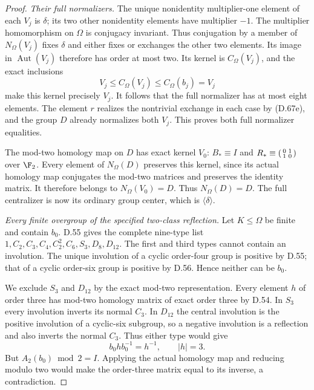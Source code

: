 \begin{proof}
\emph{Their full normalizers.}
The unique nonidentity multiplier-one element of each
$V_j$ is $\delta$; its two other nonidentity elements have
multiplier $-1$. The multiplier homomorphism on $\Omega$
is conjugacy invariant. Thus conjugation by a member of
$N_\Omega(V_j)$ fixes $\delta$ and either fixes or exchanges
the other two elements. Its image in $\operatorname{Aut}(V_j)$
therefore has order at most two. Its kernel is
$C_\Omega(V_j)$, and the exact inclusions
\[
 V_j\leq C_\Omega(V_j)\leq C_\Omega(b_j)=V_j
\]
make this kernel precisely $V_j$. It follows that the full
normalizer has at most eight elements. The element $r$
realizes the nontrivial exchange in each case by (D.67e),
and the group $D$ already normalizes both $V_j$.
This proves both full normalizer equalities.

The mod-two homology map on $D$ has exact kernel $V_0$:
$B_*\equiv I$ and $R_*\equiv\begin{psmallmatrix}0&1\\1&0\end{psmallmatrix}$
over $\F_2$. Every element of $N_\Omega(D)$ preserves this
kernel, since its actual homology map conjugates the
mod-two matrices and preserves the identity matrix.
It therefore belongs to $N_\Omega(V_0)=D$.
Thus $N_\Omega(D)=D$. The full centralizer is now its
ordinary group center, which is $\langle\delta\rangle$.

\emph{Every finite overgroup of the specified two-class reflection.}
Let $K\leq\Omega$ be finite and contain $b_0$.
D.55 gives the complete nine-type list
$1,C_2,C_3,C_4,C_2^2,C_6,S_3,D_8,D_{12}$.
The first and third types cannot contain an involution.
The unique involution of a cyclic order-four group is
positive by D.55; that of a cyclic order-six group is
positive by D.56. Hence neither can be $b_0$.

We exclude $S_3$ and $D_{12}$ by the exact mod-two
representation. Every element $h$ of order three has
mod-two homology matrix of exact order three by D.54.
In $S_3$ every involution inverts its normal $C_3$.
In $D_{12}$ the central involution is the positive
involution of a cyclic-six subgroup, so a negative
involution is a reflection and also inverts the
normal $C_3$. Thus either type would give
\[
                    b_0 h b_0^{-1}=h^{-1},\qquad |h|=3.
                                                               \tag{D.67h}
\]
But $A_2(b_0)\bmod2=I$. Applying the actual homology
map and reducing modulo two would make the order-three
matrix equal to its inverse, a contradiction.


\end{proof}
